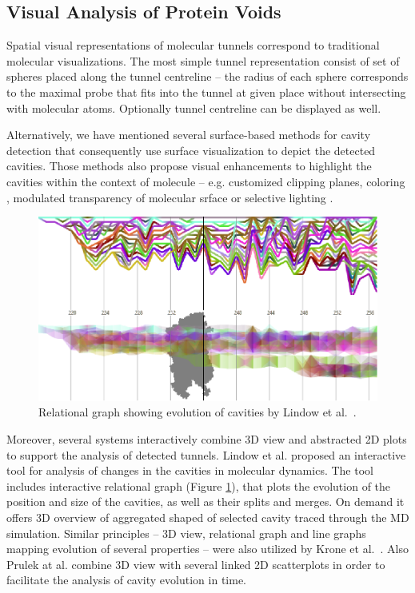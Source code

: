 \subsection{Visual Analysis of Protein Voids}
Spatial visual representations of molecular tunnels correspond to traditional molecular visualizations. The most simple tunnel representation consist of set of spheres placed along the tunnel centreline -- the radius of each sphere corresponds to the maximal probe that fits into the tunnel at given place without intersecting with molecular atoms. Optionally tunnel centreline can be displayed as well. 

Alternatively, we have mentioned several surface-based methods for cavity detection that consequently use surface visualization to depict the detected cavities. Those methods also propose visual enhancements to highlight the cavities within the context of molecule -- e.g. customized clipping planes, coloring \cite{parulek2012implicit}, modulated transparency of molecular srface \cite{jurvcik2016accelerated} or selective lighting \cite{Lindow2011Voronoi}. 

\begin{figure}
\vspace{-15pt}
  \begin{center}
  \includegraphics[width=\linewidth]{pictures/tunnels1.png}
  \caption{Relational graph showing evolution of cavities by Lindow et al.~\cite{Lindow2013DynamicCavities}.}
  \label{Fig:tunnels1}
  \end{center}  
  \vspace{-15pt}
\end{figure}

Moreover, several systems interactively combine 3D view and abstracted 2D plots to support the analysis of detected tunnels. Lindow et al. \cite{Lindow2012DynamicChannels, Lindow2013DynamicCavities} proposed an interactive tool for analysis of changes in the cavities in molecular dynamics. The tool includes interactive relational graph (Figure \ref{Fig:tunnels1}),
that plots the evolution of the position and size of the cavities, as well as their splits and merges. On demand it offers 3D overview of aggregated shaped of selected cavity traced through the MD simulation. Similar principles -- 3D view, relational graph and line graphs mapping evolution of several properties -- were also utilized by Krone et al.~\cite{krone2014visual}. Also Prulek at al. \cite{parulek2013visual} combine 3D view with several linked 2D scatterplots in order to facilitate the analysis of cavity evolution in time.

